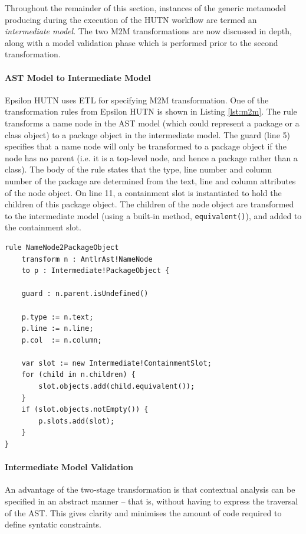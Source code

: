 Throughout the remainder of this section, instances of the generic metamodel producing during the execution of the HUTN workflow are termed an \textit{intermediate model}. The two M2M transformations are now discussed in depth, along with a model validation phase which is performed prior to the second transformation.

\paragraph{AST Model to Intermediate Model}
Epsilon HUTN uses ETL \cite{kolovos08etl} for specifying M2M transformation. One of the transformation rules from Epsilon HUTN is shown in Listing \ref{lst:m2m}. The rule transforms a name node in the AST model (which could represent a package or a class object) to a package object in the intermediate model. The guard (line 5) specifies that a name node will only be transformed to a package object if the node has no parent (i.e. it is a top-level node, and hence a package rather than a class). The body of the rule states that the type, line number and column number of the package are determined from the text, line and column attributes of the node object. On line 11, a containment slot is instantiated to hold the children of this package object. The children of the node object are transformed to the intermediate model (using a built-in method, \verb|equivalent()|), and added to the containment slot.

\begin{lstlisting}[caption=Transformation rule (in ETL) to convert AST nodes to package objects., label=lst:m2m, language=ETL]
rule NameNode2PackageObject
    transform n : AntlrAst!NameNode
    to p : Intermediate!PackageObject {

    guard : n.parent.isUndefined()

    p.type := n.text;
    p.line := n.line;
    p.col  := n.column;

    var slot := new Intermediate!ContainmentSlot;
    for (child in n.children) {
        slot.objects.add(child.equivalent());
    }
    if (slot.objects.notEmpty()) {
        p.slots.add(slot);
    }
}
\end{lstlisting}

\paragraph{Intermediate Model Validation}
An advantage of the two-stage transformation is that contextual analysis can be specified in an abstract manner -- that is, without having to express the traversal of the AST. This gives clarity and minimises the amount of code required to define syntatic constraints.

